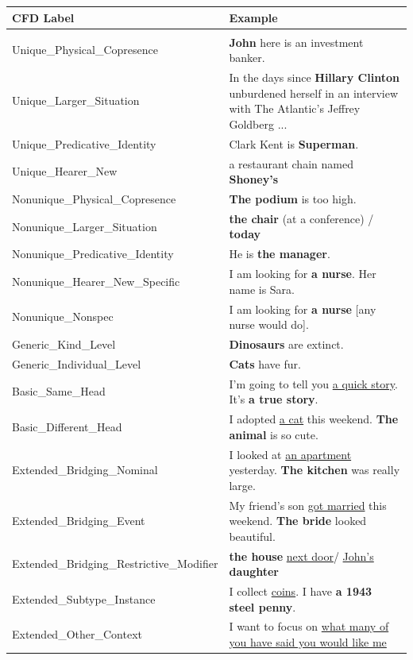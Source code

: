 \documentclass[landscape,final]{baposter}
\begin{document}
\begin{poster}
{\vspace{4pt}
\begin {left}\small
\smaller[.5]
\begin{tabular}{p{19em}p{32em}}
{\bf \normalsize{CFD Label}}&{\bf \normalsize{Example}}\\\hline\\Unique\_Physical\_Copresence & {\bf John} here is an investment banker.\\Unique\_Larger\_Situation & In the days since {\bf Hillary Clinton} unburdened herself in an interview with The Atlantic's Jeffrey Goldberg ...\\Unique\_Predicative\_Identity & Clark Kent is {\bf Superman}.\\Unique\_Hearer\_New & a restaurant chain named {\bf Shoney's}\\Nonunique\_Physical\_Copresence & {\bf The podium} is too high.\\Nonunique\_Larger\_Situation & {\bf the chair} (at a conference) / {\bf today}\\Nonunique\_Predicative\_Identity & He is {\bf the manager}.\\Nonunique\_Hearer\_New\_Specific & I am looking for {\bf a nurse}. Her name is Sara.\\Nonunique\_Nonspec & I am looking for {\bf a nurse} [any nurse would do].\\Generic\_Kind\_Level & {\bf Dinosaurs} are extinct.\\Generic\_Individual\_Level & {\bf Cats} have fur.\\Basic\_Same\_Head & I'm going to tell you \underline{a quick story}. It's {\bf a true story}.\\Basic\_Different\_Head & I adopted \underline{a cat} this weekend. {\bf The animal} is so cute.\\Extended\_Bridging\_Nominal & I looked at \underline{an apartment} yesterday. {\bf The kitchen} was really large.\\Extended\_Bridging\_Event & My friend's son \underline{got married} this weekend. {\bf The bride} looked beautiful.\\Extended\_Bridging\_Restrictive\_Modifier & {\bf the house} \underline{next door}/ \underline{John's} {\bf daughter}\\Extended\_Subtype\_Instance & I collect \underline{coins}. I have {\bf a 1943 steel penny}.\\Extended\_Other\_Context & I want to focus on \underline{what many of you have said you would like me}\\

\end{tabular}
\end{left}}
\end{poster}
\end{document}
